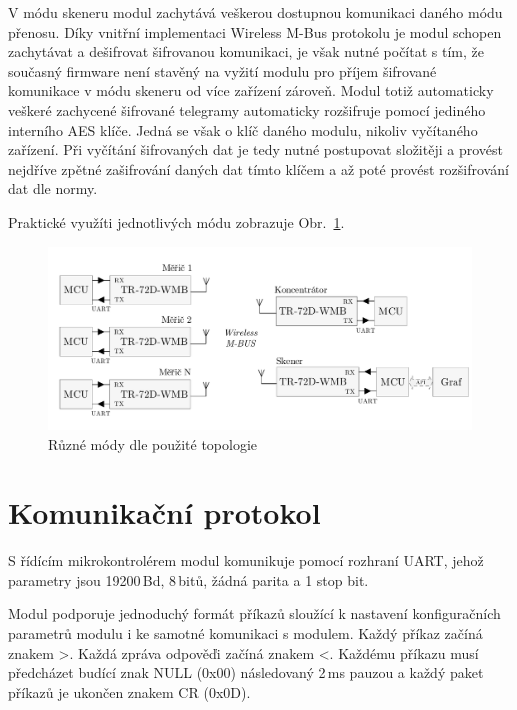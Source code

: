 V módu skeneru modul zachytává veškerou dostupnou komunikaci daného módu přenosu. Díky vnitřní implementaci Wireless M-Bus protokolu je modul schopen zachytávat a dešifrovat šifrovanou komunikaci, je však nutné počítat s tím, že současný firmware není stavěný na vyžití modulu pro příjem šifrované komunikace v módu skeneru od více zařízení zároveň. Modul totiž automaticky veškeré zachycené šifrované telegramy automaticky rozšifruje pomocí jediného interního AES klíče. Jedná se však o klíč daného modulu, nikoliv vyčítaného zařízení. Při vyčítání šifrovaných dat je tedy nutné postupovat složitěji a provést nejdříve zpětné zašifrování daných dat tímto klíčem a až poté provést rozšifrování dat dle normy.

Praktické využíti jednotlivých módu zobrazuje Obr.~\ref{TopologieIQRF}.

 \begin{figure}[!ht]
\vspace{-20pt}
  \begin{center}
    \includegraphics[scale=0.65]{obrazky/modul_topologie}
  \end{center}
	\vspace{-30pt}
  \caption{Různé módy dle použité topologie \cite{ModulIQRF}}
	\label{TopologieIQRF}
	\vspace{-20pt}
\end{figure}

\section{Komunikační protokol}

S řídícím mikrokontrolérem modul komunikuje pomocí rozhraní UART, jehož parametry jsou 19200\,Bd, 8\,bitů, žádná parita a 1 stop bit.
		
Modul podporuje jednoduchý formát příkazů sloužící k nastavení konfiguračních parametrů modulu i ke samotné komunikaci s modulem. Každý příkaz začíná znakem \textgreater. Každá zpráva odpověďi začíná znakem \textless. Každému příkazu musí předcházet budící znak NULL (0x00) následovaný 2\,ms pauzou a každý paket příkazů je ukončen znakem CR (0x0D). 

